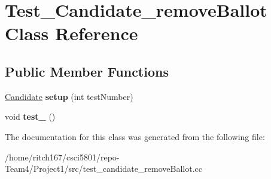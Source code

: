 \hypertarget{classTest__Candidate__removeBallot}{}\section{Test\+\_\+\+Candidate\+\_\+remove\+Ballot Class Reference}
\label{classTest__Candidate__removeBallot}
\subsection*{Public Member Functions}
\begin{DoxyCompactItemize}
\item 
\mbox{\label{classTest__Candidate__removeBallot_a0be8f7325da5afba5e4baa5db7c0cc3a}} 
\hyperlink{classCandidate}{Candidate} {\bfseries setup} (int test\+Number)
\item 
\mbox{\label{classTest__Candidate__removeBallot_ab29800dca43f2d093d4b9e3a37632b87}} 
void {\bfseries test\+\_} ()
\end{DoxyCompactItemize}


The documentation for this class was generated from the following file\+:\begin{DoxyCompactItemize}
\item 
/home/ritch167/csci5801/repo-\/\+Team4/\+Project1/src/test\+\_\+candidate\+\_\+remove\+Ballot.\+cc\end{DoxyCompactItemize}
